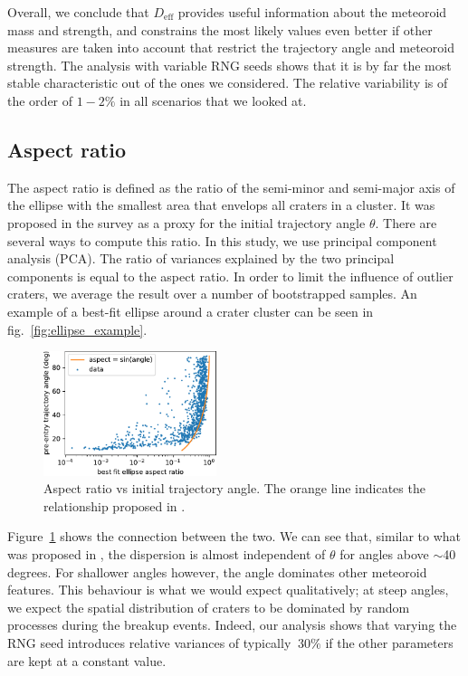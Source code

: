 Overall, we conclude that $D_\mathrm{eff}$ provides useful information about the meteoroid mass and strength, and constrains the most likely values even better if other measures are taken into account that restrict the trajectory angle and meteoroid strength. The analysis with variable RNG seeds shows that it is by far the most stable characteristic out of the ones we considered. The relative variability is of the order of $1 - 2\%$ in all scenarios that we looked at.

\subsection{Aspect ratio}
The aspect ratio is defined as the ratio of the semi-minor and semi-major axis of the ellipse with the smallest area that envelops all craters in a cluster.
It was proposed in the \cite{daubar2019recently} survey as a proxy for the initial trajectory angle $\theta$. 
There are several ways to compute this ratio. In this study, we use principal component analysis (PCA).
The ratio of variances explained by the two principal components is equal to the aspect ratio. In order to limit the influence of outlier craters, we average the result over a number of bootstrapped samples. An example of a best-fit ellipse around a crater cluster can be seen in fig.~\ref{fig:ellipse_example}.

\begin{figure}[htbp]
    \centering
    \includegraphics[width=0.45\textwidth]{figures/aspect_vs_angle}
    \caption{Aspect ratio vs initial trajectory angle. The orange line indicates the relationship proposed in \cite{daubar2019recently}.}
    \label{fig:aspect_vs_angle}
\end{figure}

Figure~\ref{fig:aspect_vs_angle} shows the connection between the two. We can see that, similar to what was proposed in \cite{daubar2019recently}, the dispersion is almost independent of $\theta$ for angles above $\sim$40 degrees.
For shallower angles however, the angle dominates other meteoroid features. This behaviour is what we would expect qualitatively; at steep angles, we expect the spatial distribution of craters to be dominated by random processes during the breakup events.
Indeed, our analysis shows that varying the RNG seed introduces relative variances of typically $~30\%$ if the other parameters are kept at a constant value.

